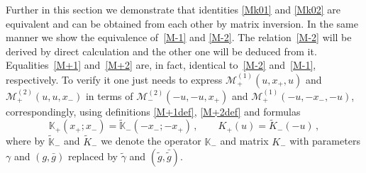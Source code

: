 \documentclass[a4paper,11pt]{article}
\numberwithin{equation}{section}
\begin{document}
Further in this section we demonstrate that identities \eqref{Mk01} and \eqref{Mk02} are equivalent and can be obtained from each other by matrix inversion.
In the same manner we show the equivalence of~\eqref{M-1} and \eqref{M-2}. The relation~\eqref{M-2} will be derived by direct calculation and the other one will be deduced from it.
Equalities~\eqref{M+1} and~\eqref{M+2} are, in fact, identical to~\eqref{M-2} and~\eqref{M-1}, respectively.
To verify it one just needs to express $\mathcal{M}^{(1)}_+(u,x_+,u)$ and $\mathcal{M}^{(2)}_+(u,u,x_-)$ in terms of $\mathcal{M}^{(2)}_-(-u,-u,x_+)$ and $\mathcal{M}^{(1)}_+(-u,-x_-,-u)$, correspondingly, using definitions \eqref{M+1def}, \eqref{M+2def} and formulas
\begin{equation} \nonumber
	\mathbb{K}_+(x_+;x_-) = \tilde{\mathbb{K}}_-(-x_-;-x_+) \,, \qquad
	K_+(u) = \tilde{K}_-(-u) \,,
\end{equation}
where by $\tilde{\mathbb{K}}_-$ and $\tilde{K}_-$ we denote the operator $\mathbb{K}_-$ and matrix $K_-$ with parameters $\gamma$ and $(g,\bar{g})$ replaced by $\tilde{\gamma}$ and $(\tilde{g},\bar{\tilde{g}})$.
\end{document}
